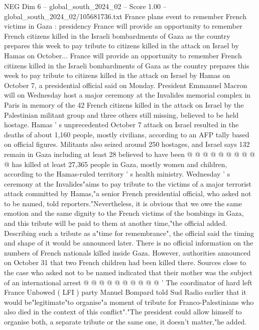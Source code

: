 \begin{textsample}{NEG Dim 6 – global\_south\_2024\_02 – Score 1.00 – global\_south\_2024\_02/105681736.txt}  \label{ex:f6_neg_270}
France plans event to remember French victims in Gaza : presidency France will provide an opportunity to remember French citizens killed in the Israeli bombardments of Gaza as the country prepares this week to pay tribute to citizens killed in the attack on Israel by Hamas on October...
France will provide an opportunity to remember French citizens killed in the Israeli bombardments of Gaza as the country prepares this week to pay tribute to citizens killed in the attack on Israel by Hamas on October 7, a presidential official said on Monday.
President Emmanuel Macron will on Wednesday host a major ceremony at the Invalides memorial complex in Paris in memory of the 42 French citizens killed in the attack on Israel by the Palestinian militant group and three others still missing, believed to be held hostage.
Hamas ' s unprecedented October 7 attack on Israel resulted in the deaths of about 1,160 people, mostly civilians, according to an AFP tally based on official figures.
Militants also seized around 250 hostages, and Israel says 132 remain in Gaza including at least 28 believed to have been @ @ @ @ @ @ @ @ @ @ has killed at least 27,365 people in Gaza, mostly women and children, according to the Hamas-ruled territory ' s health ministry.
Wednesday ' s ceremony at the Invalides"aims to pay tribute to the victims of a major terrorist attack committed by Hamas,"a senior French presidential official, who asked not to be named, told reporters."Nevertheless, it is obvious that we owe the same emotion and the same dignity to the French victims of the bombings in Gaza, and this tribute will be paid to them at another time,"the official added.
Describing such a tribute as a"time for remembrance", the official said the timing and shape of it would be announced later.
There is no official information on the numbers of French nationals killed inside Gaza.
However, authorities announced on October 31 that two French children had been killed there.
Sources close to the case who asked not to be named indicated that their mother was the subject of an international arrest @ @ @ @ @ @ @ @ @ @ ' The coordinator of hard left France Unbowed ( LFI ) party Manuel Bompard told Sud Radio earlier that it would be"legitimate"to organise"a moment of tribute for Franco-Palestinians who also died in the context of this conflict"."The president could allow himself to organise both, a separate tribute or the same one, it doesn't matter,"he added.

\end{textsample}
